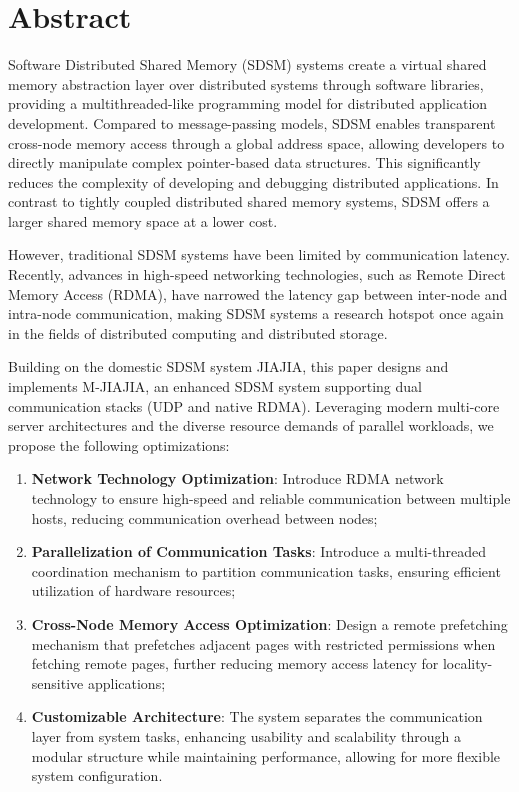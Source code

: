 \intobmk\chapter*{Abstract}%

Software Distributed Shared Memory (SDSM) systems create a virtual shared memory abstraction layer over distributed systems through software libraries, providing a multithreaded-like programming model for distributed application development. Compared to message-passing models, SDSM enables transparent cross-node memory access through a global address space, allowing developers to directly manipulate complex pointer-based data structures. This significantly reduces the complexity of developing and debugging distributed applications. In contrast to tightly coupled distributed shared memory systems, SDSM offers a larger shared memory space at a lower cost.

However, traditional SDSM systems have been limited by communication latency. Recently, advances in high-speed networking technologies, such as Remote Direct Memory Access (RDMA), have narrowed the latency gap between inter-node and intra-node communication, making SDSM systems a research hotspot once again in the fields of distributed computing and distributed storage.

Building on the domestic SDSM system JIAJIA, this paper designs and implements M-JIAJIA, an enhanced SDSM system supporting dual communication stacks (UDP and native RDMA). Leveraging modern multi-core server architectures and the diverse resource demands of parallel workloads, we propose the following optimizations:

\begin{enumerate}[label=\arabic*.]
    \item \textbf{Network Technology Optimization}: Introduce RDMA network technology to ensure high-speed and reliable communication between multiple hosts, reducing communication overhead between nodes;
    \item \textbf{Parallelization of Communication Tasks}: Introduce a multi-threaded coordination mechanism to partition communication tasks, ensuring efficient utilization of hardware resources;
    \item \textbf{Cross-Node Memory Access Optimization}: Design a remote prefetching mechanism that prefetches adjacent pages with restricted permissions when fetching remote pages, further reducing memory access latency for locality-sensitive applications;
    \item \textbf{Customizable Architecture}: The system separates the communication layer from system tasks, enhancing usability and scalability through a modular structure while maintaining performance, allowing for more flexible system configuration.
\end{enumerate}


